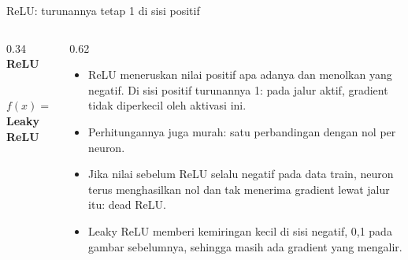 \documentclass[aspectratio=169,t]{beamer}
\begin{document}
\begin{frame}{ReLU: turunannya tetap 1 di sisi positif}
  \vspace{0.2em}
  \begin{columns}[T]
    \begin{column}{0.34\textwidth}
      \centering
      \textbf{\color{nvgreen}ReLU}\\[0.3em]
      \\[0.3em]
      {\scriptsize $f(x)=\max(0,\,x)$}\\[0.5em]
      \textbf{\color{nvlightgreen}Leaky ReLU}\\[0.3em]
    \end{column}
    \begin{column}{0.62\textwidth}
      \vspace{0.2em}
      \begin{itemize}\setlength\itemsep{0.35em}
        \item ReLU meneruskan nilai positif apa adanya dan menolkan yang negatif. Di sisi
              positif turunannya 1: pada jalur aktif, gradient tidak diperkecil oleh
              aktivasi ini.
        \item Perhitungannya juga murah: satu perbandingan dengan nol per neuron.
        \item Jika nilai sebelum ReLU selalu negatif pada data train, neuron terus
              menghasilkan nol dan tak menerima gradient lewat jalur itu: dead ReLU.
        \item Leaky ReLU memberi kemiringan kecil di sisi negatif, 0,1 pada gambar
              sebelumnya, sehingga masih ada gradient yang mengalir.
      \end{itemize}
    \end{column}
  \end{columns}
\end{frame}
\end{document}
